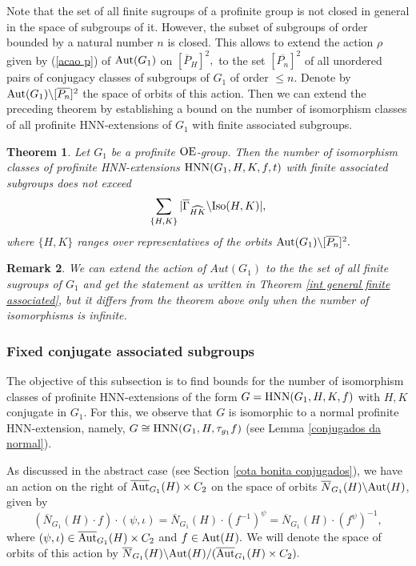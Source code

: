 \documentclass[a4paper,12pt]{article}
\newtheorem{thm}{Theorem}[section]
\def\OE{{\rm OE}}
\def\aut {{\rm Aut}}
\def\hnn {{\rm HNN}}
\def\Iso {{\rm Iso}}
\newtheorem{rem}[thm]{Remark}
\begin{document}
{Note that the set of all finite sugroups of a profinite group is not closed in general in the space of subgroups of it. However, the subset of subgroups of order bounded by a natural number $n$ is closed. This allows to extend the action $\rho$ given by (\ref{acao p}) of $\aut(G_1)$ on $[\overline{P}_H]^2,$ to the set $[\overline{P_n}]^2$ of all unordered pairs of conjugacy classes of  subgroups of $G_1$ of order $\leq n$. Denote by $\aut(G_1) \backslash [\overline{P_n}]^2$ the space of orbits of this action. Then we can extend the preceding theorem by establishing a bound on the number of isomorphism classes of all profinite HNN-extensions of $G_1$ with finite associated subgroups.

\begin{thm}\label{profinite HNN-extensions with finite associated} Let $G_1$ be a profinite  $\OE$-group. Then the number  of isomorphism classes of profinite HNN-extensions $\hnn(G_1, H, K, f, t)$ with finite associated subgroups does not exceed  $$ \sum_{\{H, K\}} | \overline{\Gamma}_{\widehat{HK}} \backslash \Iso(H, K)|,$$ where $\{H, K\}$ ranges over representatives of the orbits $\aut(G_1)\backslash [\overline{P_n}]^2.$ 
\end{thm} 

\begin{rem} We can extend the action of $Aut(G_1)$ to the the set of all finite sugroups of $G_1$ and get the statement as written in Theorem \ref{int general finite associated}, but it differs from the theorem above only when the number of isomorphisms is infinite.\end{rem}


\subsubsection{ Fixed conjugate associated subgroups } \label{quotasprofconjugates}

The objective of this subsection is to find  bounds for  the number of isomorphism classes of profinite HNN-extensions of the form $G=\hnn(G_1, H, K, f)$ with $H,K$ conjugate in $G_1$. For this, we observe that $G$ is isomorphic to a normal profinite HNN-extension, namely, $G\cong \hnn(G_1, H,   \tau_{g_1}f)$ (see Lemma \ref{conjugados da normal}). 

As discussed in the abstract case (see Section \ref{cota bonita conjugados}), we have an action on the right of $\overline{\aut}_{G_1}(H) \times C_2$ on the space of orbits $\overline{N}_{G_1}(H) \backslash \aut(H)$, given by  \begin{equation} \label{acao bunitaap} \left( \overline{N}_{G_1}(H) \cdot f \right) \cdot (\psi, \iota) = \overline{N}_{G_1}(H) \cdot  (f^{-1})^{\psi}=\overline{N}_{G_1}(H) \cdot \left(f^{\psi}\right)^{-1},\end{equation}
where $( \psi, \iota) \in  \overline{\aut}_{G_1}(H) \times C_2$ and $f \in \aut(H).$ We will denote the space of orbits of this action by $\overline{N}_{G_1}(H) \backslash \aut(H)/ ( \overline{\aut}_{G_1}(H) \times C_2).$ 


}
\end{document}
